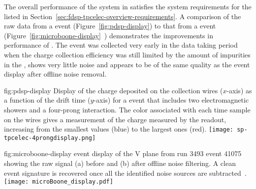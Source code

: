 The overall performance of the  system in 
 satisfies the %
 system requirements for the  
listed in Section~\ref{sec:fdsp-tpcelec-overview-requirements}. 
%
A comparison of the raw data from 
a  event (Figure~\ref{fig:pdsp-display}) to 
that from a  event (Figure~\ref{fig:microboone-display}~\cite{Acciarri:2017sde}) demonstrates the improvements in performance of . 
The  event was collected very early in the data taking
period when the charge collection efficiency was still limited
by the amount of impurities in the , shows very little
noise and appears to be of the same quality as the 
event display after offline noise removal. 


\begin{dunefigure}
{fig:pdsp-display}
{Display of the charge deposited on the collection wires ($x$-axis) as
a function of the drift time ($y$-axis) for a  event 
that includes two electromagnetic showers and a four-prong interaction.
The color associated with each time sample on the 
wires gives a measurement of the charge measured by the 
readout, increasing from the smallest values (blue) to the largest
ones (red).}
\texttt{[image: sp-tpcelec-4prongdisplay.png]}
\end{dunefigure}

\begin{dunefigure}
{fig:microboone-display}
{ \twod event display of the V plane from run 3493 
event 41075 showing the raw signal (a) before and (b) after offline 
noise filtering. A clean event signature is recovered once all the 
identified noise sources are subtracted~\cite{Acciarri:2017sde}.}
\texttt{[image: microBoone\_display.pdf]}
\end{dunefigure}

